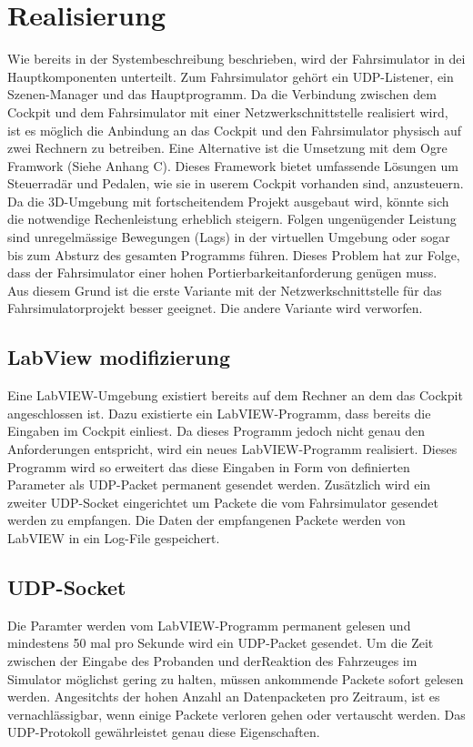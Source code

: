 \section{Realisierung}
Wie bereits in der Systembeschreibung beschrieben, wird der Fahrsimulator in dei Hauptkomponenten unterteilt. Zum Fahrsimulator gehört ein UDP-Listener, ein Szenen-Manager und das Hauptprogramm. Da die Verbindung zwischen dem Cockpit und dem Fahrsimulator mit einer Netzwerkschnittstelle realisiert wird, ist es möglich die Anbindung an das Cockpit und den Fahrsimulator physisch auf zwei Rechnern zu betreiben. Eine Alternative ist die Umsetzung mit dem Ogre Framwork (Siehe Anhang C). Dieses Framework bietet umfassende Lösungen um Steuerradär und Pedalen, wie sie in userem Cockpit vorhanden sind, anzusteuern.\\
Da die 3D-Umgebung mit fortscheitendem Projekt ausgebaut wird, könnte sich die notwendige Rechenleistung erheblich steigern. Folgen ungenügender Leistung sind unregelmässige Bewegungen (Lags) in der virtuellen Umgebung oder sogar bis zum Absturz des gesamten Programms führen. Dieses Problem hat zur Folge, dass der Fahrsimulator einer hohen Portierbarkeitanforderung genügen muss. \\
Aus diesem Grund ist die erste Variante mit der Netzwerkschnittstelle für das Fahrsimulatorprojekt besser geeignet. Die andere Variante wird verworfen.
\subsection{LabView modifizierung}
Eine LabVIEW-Umgebung existiert bereits auf dem Rechner an dem das Cockpit angeschlossen ist. Dazu existierte ein LabVIEW-Programm, dass bereits die Eingaben im Cockpit einliest. Da dieses Programm jedoch nicht genau den Anforderungen entspricht, wird ein neues LabVIEW-Programm realisiert. Dieses Programm wird so erweitert das diese Eingaben in Form von definierten Parameter als UDP-Packet permanent gesendet werden. Zusätzlich wird ein zweiter UDP-Socket eingerichtet um Packete die vom Fahrsimulator gesendet werden zu empfangen. Die Daten der empfangenen Packete werden von LabVIEW in ein Log-File gespeichert. 
\subsection{UDP-Socket}
Die Paramter werden vom LabVIEW-Programm permanent gelesen und mindestens 50 mal pro Sekunde wird ein UDP-Packet gesendet. Um die Zeit zwischen der Eingabe des Probanden und derReaktion des Fahrzeuges im Simulator möglichst gering zu halten, müssen ankommende Packete sofort gelesen werden. Angesitchts der hohen Anzahl an Datenpacketen pro Zeitraum, ist es vernachlässigbar, wenn einige Packete verloren gehen oder vertauscht werden. Das UDP-Protokoll gewährleistet genau diese Eigenschaften.


